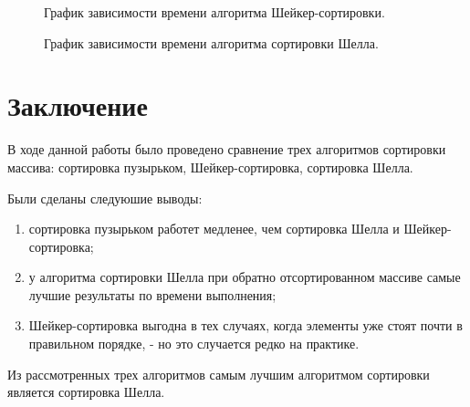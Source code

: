 \documentclass[a4paper]{article}
\begin{document}
\begin{figure}[h]
	\caption{График зависимости времени алгоритма Шейкер-сортировки. \centering}
	\label{image6}
\end{figure}

\begin{figure}[h]
	\caption{График зависимости времени алгоритма сортировки Шелла. \centering}
	\label{image7}
\end{figure}
\clearpage

\section{Заключение}
В ходе данной работы было проведено сравнение трех алгоритмов сортировки массива: сортировка пузырьком, Шейкер-сортировка, сортировка Шелла.

Были сделаны следуюшие выводы:
\begin{enumerate}
	\item сортировка пузырьком работет медленее, чем сортировка Шелла и Шейкер-сортировка;
	\item у алгоритма сортировки Шелла при обратно отсортированном массиве самые лучшие результаты по времени выполнения;
	\item Шейкер-сортировка выгодна в тех случаях, когда элементы уже стоят почти в правильном порядке, - но это случается редко на практике. \cite{nikvirt}
\end{enumerate}
Из рассмотренных трех алгоритмов самым лучшим алгоритмом сортировки является сортировка Шелла.
\clearpage
\end{document}
